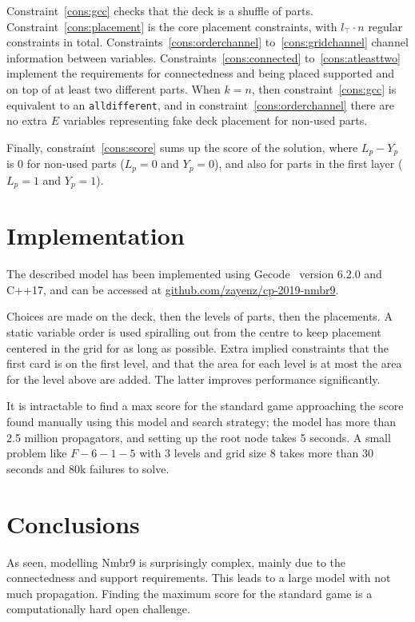 \documentclass[letterpaper]{article} %
\newcommand{\cons}[1]{\texttt{#1}}
\begin{document}
Constraint~\ref{cons:gcc} checks that the deck is a shuffle of
parts. Constraint~\ref{cons:placement} is the core placement
constraints, with $l_\top\cdot n$ regular constraints in
total. Constraints~\ref{cons:orderchannel} to~\ref{cons:gridchannel}
channel information between variables.
Constraints~\ref{cons:connected} to~\ref{cons:atleasttwo} implement
the requirements for connectedness and being placed supported and on
top of at least two different parts. When $k=n$, then
constraint~\ref{cons:gcc} is equivalent to an \cons{alldifferent}, and
in constraint~\ref{cons:orderchannel} there are no extra $E$ variables
representing fake deck placement for non-used parts.

Finally, constraint~\ref{cons:score} sums up the score of the
solution, where $L_p-Y_p$ is 0 for non-used parts ($L_p=0$ and
$Y_p=0$), and also for parts in the first layer ($L_p=1$ and $Y_p=1$).


\section{Implementation}
\label{sec:implementation}

The described model has been implemented using Gecode~\cite{gecode}
version 6.2.0 and C++17, and can be accessed at
\url{github.com/zayenz/cp-2019-nmbr9}.

Choices are made on the deck, then the levels of parts, then the
placements. A static variable order is used spiralling out from the
centre to keep placement centered in the grid for as long as possible.
Extra implied constraints that the first card is on the first level,
and that the area for each level is at most the area for the level
above are added. The latter improves performance significantly.

It is intractable to find a max score
for the standard game approaching the score found manually using this
model and search strategy; the model has more than 2.5 million
propagators, and setting up the root node takes 5 seconds. A small
problem like $F{-}6{-}1{-}5$ with 3 levels and grid size 8 takes more
than 30 seconds and 80k failures to solve.

\section{Conclusions}
\label{sec:conclusions}

As seen, modelling Nmbr9 is surprisingly complex, 
mainly due to the connectedness and support
requirements. This leads to a large model with not much
propagation. Finding the maximum score for the standard game is a
computationally hard open challenge.
\end{document}
